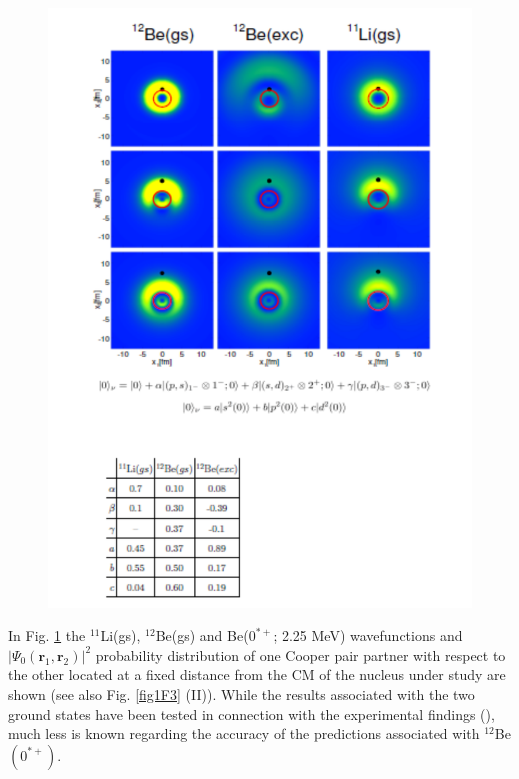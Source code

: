    \begin{figure}
   	\centerline{\includegraphics*[width=\textwidth,angle=0.]{nutshell/figs/fig3_8_2x}}
   	\caption{}\label{fig3.8.2}
   \end{figure}
In Fig. \ref{fig3.8.2} the $^{11}$Li(gs), $^{12}$Be(gs) and Be($0^{*+}$; 2.25 MeV) wavefunctions and $|\Psi_0(\mathbf r_1,\mathbf r_2)|^2$ probability distribution of one Cooper pair partner with respect to the other located at a fixed distance from the CM of the nucleus under study are shown (see also Fig. \ref{fig1F3} (II)). While the results associated with the two ground states have been tested in connection with the experimental findings (\cite{Barranco:01,Potel:10,Potel:14,Gori:04}), much less is known regarding the accuracy of the predictions associated with $^{12}$Be$(0^{*+})$.  






